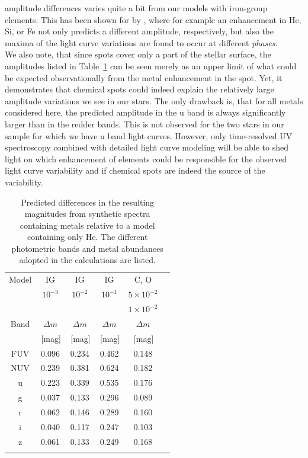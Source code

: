\documentclass{aa}
\begin{document}
amplitude differences varies quite a bit from our models with iron-group
elements. This has been shown for  by \cite{Krticka+2020a},
where for example an enhancement in He, Si, or Fe not only
predicts a different amplitude, respectively, but also the maxima of the
light curve variations are found to occur at different \textit{phases}.\\
We also note, that since spots cover only a part of the stellar surface,
the amplitudes listed in Table~\ref{tab:spots} can be seen merely as an upper
limit of what could be expected observationally from the metal enhancement
in the spot. Yet, it demonstrates that chemical spots could indeed
explain the relatively large amplitude variations we see in our stars.
The only drawback is, that for all metals considered here, the predicted
amplitude in the u band is always significantly larger than in the redder
bands. This is not observed for the two stars in our sample for which we have
u band light curves. However, only time-resolved UV spectroscopy combined
with detailed light curve modeling will be able to shed light on which
enhancement of elements could be responsible for the observed light
curve variability and if chemical spots are indeed the source of the
variability.\\
\begin{table}
\centering
\caption{Predicted differences in the resulting magnitudes from synthetic
  spectra containing metals relative to a model containing only He.
  The different photometric bands and metal abundances adopted in the
  calculations are listed.}
\label{tab:spots}
\begin{tabular}{c c c c c c}
\hline\hline
\noalign{\smallskip}
Model & IG     & IG     & IG     & C, O \\
      & $10^{-3}$ & $10^{-2}$ & $10^{-1}$ & $5\times10^{-2}$\\
      &        &        &        & $1\times10^{-2}$\\        
\noalign{\smallskip}
Band & $\Delta m$ & $\Delta m$ & $\Delta m$ & $\Delta m$ \\
& \,[mag] & \,[mag]   & \,[mag] & \,[mag]\\
\hline
\noalign{\smallskip}
FUV & 0.096 & 0.234 & 0.462 & 0.148 \\
NUV & 0.239 & 0.381 & 0.624 & 0.182 \\
u   & 0.223 & 0.339 & 0.535 & 0.176 \\
g   & 0.037 & 0.133 & 0.296 & 0.089 \\
r   & 0.062 & 0.146 & 0.289 & 0.160 \\
i   & 0.040 & 0.117 & 0.247 & 0.103 \\
z   & 0.061 & 0.133 & 0.249 & 0.168 \\
\hline
\noalign{\smallskip}
\end{tabular}
\end{table}
 
\end{document}
